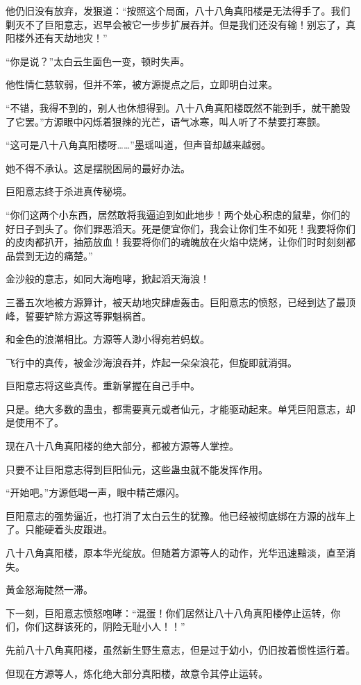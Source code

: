 \begin{this_body}
他仍旧没有放弃，发狠道：“按照这个局面，八十八角真阳楼是无法得手了。我们剿灭不了巨阳意志，迟早会被它一步步扩展吞并。但是我们还没有输！别忘了，真阳楼外还有天劫地灾！”

“你是说？”太白云生面色一变，顿时失声。

他性情仁慈软弱，但并不笨，被方源提点之后，立即明白过来。

“不错，我得不到的，别人也休想得到。八十八角真阳楼既然不能到手，就干脆毁了它罢。”方源眼中闪烁着狠辣的光芒，语气冰寒，叫人听了不禁要打寒颤。

“这可是八十八角真阳楼呀……”墨瑶叫道，但声音却越来越弱。

她不得不承认。这是摆脱困局的最好办法。

巨阳意志终于杀进真传秘境。

“你们这两个小东西，居然敢将我逼迫到如此地步！两个处心积虑的鼠辈，你们的好日子到头了。你们罪恶滔天。死是便宜你们，我会让你们生不如死！我要将你们的皮肉都扒开，抽筋放血！我要将你们的魂魄放在火焰中烧烤，让你们时时刻刻都品尝到无边的痛楚。”

金沙般的意志，如同大海咆哮，掀起滔天海浪！

三番五次地被方源算计，被天劫地灾肆虐轰击。巨阳意志的愤怒，已经到达了最顶峰，誓要铲除方源这等罪魁祸首。

和金色的浪潮相比。方源等人渺小得宛若蚂蚁。

飞行中的真传，被金沙海浪吞并，炸起一朵朵浪花，但旋即就消弭。

巨阳意志将这些真传。重新掌握在自己手中。

只是。绝大多数的蛊虫，都需要真元或者仙元，才能驱动起来。单凭巨阳意志，却是使用不了。

现在八十八角真阳楼的绝大部分，都被方源等人掌控。

只要不让巨阳意志得到巨阳仙元，这些蛊虫就不能发挥作用。

“开始吧。”方源低喝一声，眼中精芒爆闪。

巨阳意志的强势逼近，也打消了太白云生的犹豫。他已经被彻底绑在方源的战车上了。只能硬着头皮跟进。

八十八角真阳楼，原本华光绽放。但随着方源等人的动作，光华迅速黯淡，直至消失。

黄金怒海陡然一滞。

下一刻，巨阳意志愤怒咆哮：“混蛋！你们居然让八十八角真阳楼停止运转，你们，你们这群该死的，阴险无耻小人！！”

先前八十八角真阳楼，虽然新生野生意志，但是过于幼小，仍旧按着惯性运行着。

但现在方源等人，炼化绝大部分真阳楼，故意令其停止运转。


\end{this_body}
